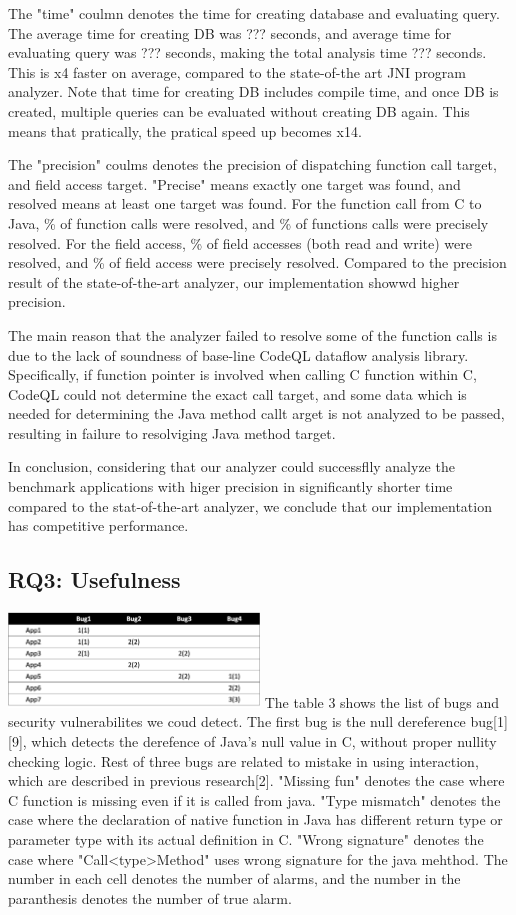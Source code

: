 The "time" coulmn denotes the time for creating database and evaluating query.
The average time for creating DB was ??? seconds, and average time for
evaluating query was ???  seconds, making the total analysis time ??? seconds.
This is x4 faster on average, compared to the state-of-the art JNI program
analyzer.  Note that time for creating DB includes compile time, and once DB is
created, multiple queries can be evaluated without creating DB again. This means
that pratically, the pratical speed up becomes x14.

The "precision" coulms denotes the precision of dispatching function call
target, and field access target.  "Precise" means exactly one target was found,
and resolved means at least one target was found. For the function call from C to Java,
\% of function calls were resolved, and \% of functions calls
were precisely resolved. For the field access, \% of field accesses (both
read and write) were resolved, and \% of field access were precisely resolved.
Compared to the precision result of the state-of-the-art analyzer, our implementation
showwd higher precision.

The main reason that the analyzer failed to resolve some of the function calls
is due to the lack of soundness of base-line CodeQL dataflow analysis library.
Specifically, if function pointer is involved when calling C function within C,
CodeQL could not determine the exact call target, and some data which is needed
for determining the Java method callt arget is not analyzed to be passed, resulting
in failure to resolviging Java method target.

In conclusion, considering that our analyzer could successflly analyze the
benchmark applications with higer precision in significantly shorter time
compared to the stat-of-the-art analyzer, we conclude that our implementation
has competitive performance.

\subsection{RQ3: Usefulness}
\includegraphics[width=0.5\textwidth]{img/table3}
The table 3 shows the list of bugs and security vulnerabilites we coud detect.
The first bug is the null dereference bug[1][9], which detects the derefence of
Java's null value in C, without proper nullity checking logic. Rest of three
bugs are related to mistake in using interaction, which are described in
previous research[2]. "Missing fun" denotes the case where C function is
missing even if it is called from java. "Type mismatch" denotes the case where
the declaration of native function in Java has different return type or
parameter type with its actual definition in C.  "Wrong signature" denotes the
case where "Call<type>Method" uses wrong signature for the java mehthod. The
number in each cell denotes the number of alarms, and the number in the
paranthesis denotes the number of true alarm.

